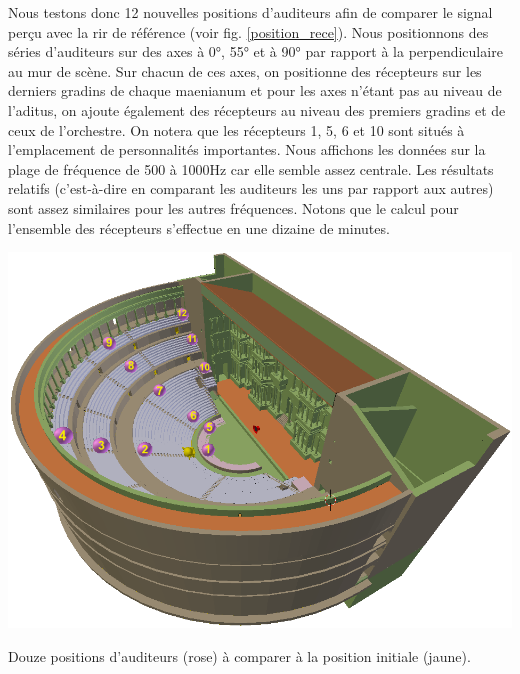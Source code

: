 Nous testons donc 12 nouvelles positions d'auditeurs afin de comparer le signal perçu avec la \gls{rir} de référence (voir fig. \ref{position_rece}). Nous positionnons des séries d'auditeurs sur des axes à 0°, 55° et à 90° par rapport à la perpendiculaire au mur de scène. Sur chacun de ces axes, on positionne des récepteurs sur les derniers gradins de chaque \gls{maenianum} et pour les axes n'étant pas au niveau de l'\gls{aditus}, on ajoute également des récepteurs au niveau des premiers gradins et de ceux de l'orchestre. On notera que les récepteurs 1, 5, 6 et 10 sont situés à l'emplacement de personnalités importantes. Nous affichons les données sur la plage de fréquence de 500 à 1000Hz car elle semble assez centrale. Les résultats relatifs (c'est-à-dire en comparant les auditeurs les uns par rapport aux autres) sont assez similaires pour les autres fréquences. Notons que le calcul pour l'ensemble des récepteurs s'effectue en une dizaine de minutes.
\begin{figureth}
	\includegraphics[width=\linewidth]{images/position_rece}
	\caption{Douze positions d'auditeurs (rose) à comparer à la position initiale (jaune).}
	\label{position_rece}
\end{figureth}
%
